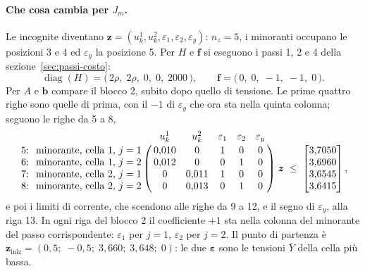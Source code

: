 \documentclass[11pt,a4paper]{article}
\newcommand{\vett}[1]{\boldsymbol{#1}}      %
\begin{document}
\paragraph{Che cosa cambia per $J_m$.} Le incognite diventano
$\vett{z} = (u^1_k, u^2_k, \varepsilon_1, \varepsilon_2, \varepsilon_y)$: $n_z = 5$, i minoranti
occupano le posizioni 3 e 4 ed $\varepsilon_y$ la posizione 5. Per $H$ e $\vett{f}$ si eseguono
i passi 1, 2 e 4 della sezione~\ref{sec:passi-costo}:
\[
  \operatorname{diag}(H) = \bigl(\, 2\rho,\; 2\rho,\; 0,\; 0,\; 2000 \,\bigr) ,
  \qquad
  \vett{f} = \bigl(\, 0,\; 0,\; -1,\; -1,\; 0 \,\bigr) .
\]
Per $A$ e $\vett{b}$ compare il blocco 2, subito dopo quello di tensione. Le prime
quattro righe sono quelle di prima, con il $-1$ di $\varepsilon_y$ che ora sta nella
quinta colonna; seguono le righe da 5 a 8,
\[
  \bordermatrix{
      & u^1_k & u^2_k & \varepsilon_1 & \varepsilon_2 & \varepsilon_y \cr
    \text{5:\; minorante, cella 1, } j = 1 & 0{,}010 & 0 & 1 & 0 & 0 \cr
    \text{6:\; minorante, cella 1, } j = 2 & 0{,}012 & 0 & 0 & 1 & 0 \cr
    \text{7:\; minorante, cella 2, } j = 1 & 0 & 0{,}011 & 1 & 0 & 0 \cr
    \text{8:\; minorante, cella 2, } j = 2 & 0 & 0{,}013 & 0 & 1 & 0 \cr
  }
  \; \vett{z} \;\le\;
  \begin{bmatrix} 3{,}7050 \\ 3{,}6960 \\ 3{,}6545 \\ 3{,}6415 \end{bmatrix} ,
\]
e poi i limiti di corrente, che scendono alle righe da 9 a 12, e il segno di
$\varepsilon_y$, alla riga 13. In ogni riga del blocco 2 il coefficiente $+1$ sta nella
colonna del minorante del passo corrispondente: $\varepsilon_1$ per $j = 1$,
$\varepsilon_2$ per $j = 2$. Il punto di partenza è
$\vett{z}_{\mathrm{iniz}} = (0{,}5;\; -0{,}5;\; 3{,}660;\; 3{,}648;\; 0)$: le due $\vett{\varepsilon}$
sono le tensioni $\bar Y$ della cella più bassa.
\end{document}
